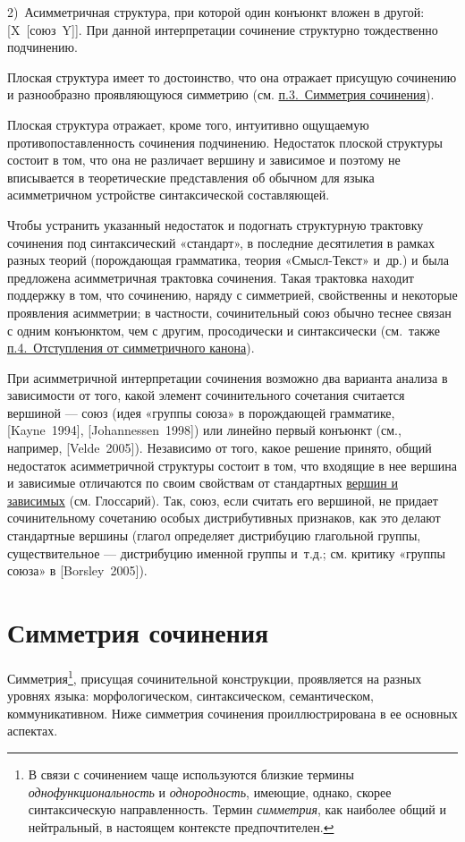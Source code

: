 2)~Асимметричная структура, при которой один конъюнкт вложен в другой:
{[}X~{[}союз~Y{]}{]}. При данной интерпретации сочинение структурно
тождественно подчинению.

Плоская структура имеет то достоинство, что она отражает присущую
сочинению и разнообразно проявляющуюся симметрию (см.
\underline{п.3.~Симметрия сочинения}).

Плоская структура отражает, кроме того, интуитивно ощущаемую
противопоставленность сочинения подчинению. Недостаток плоской структуры
состоит в том, что она не различает вершину и зависимое и поэтому не
вписывается в теоретические представления об обычном для языка
асимметричном устройстве синтаксической составляющей.

Чтобы устранить указанный недостаток и подогнать структурную трактовку
сочинения под синтаксический «стандарт», в последние десятилетия в
рамках разных теорий (порождающая грамматика, теория «Смысл-Текст»
и~др.) и была предложена асимметричная трактовка сочинения. Такая
трактовка находит поддержку в том, что сочинению, наряду с симметрией,
свойственны и некоторые проявления асимметрии; в частности,
сочинительный союз обычно теснее связан с одним конъюнктом, чем с
другим, просодически и синтаксически (см.~также
\underline{п.4.~Отступления от симметричного канона}).

При асимметричной интерпретации сочинения возможно два варианта анализа
в зависимости от того, какой элемент сочинительного сочетания считается
вершиной --- союз (идея «группы союза» в порождающей грамматике,
{[}Kayne~1994{]}, {[}Johannessen~1998{]}) или линейно первый конъюнкт
(см., например, {[}Velde~2005{]}). Независимо от того, какое решение
принято, общий недостаток асимметричной структуры состоит в том, что
входящие в нее вершина и зависимые отличаются по своим свойствам от
стандартных \underline{вершин и зависимых} (см. Глоссарий). Так, союз,
если считать его вершиной, не придает сочинительному сочетанию особых
дистрибутивных признаков, как это делают стандартные вершины (глагол
определяет дистрибуцию глагольной группы, существительное --- дистрибуцию
именной группы и~т.д.; см. критику «группы союза» в {[}Borsley~2005{]}).

\section{Симметрия
  сочинения}\label{ux441ux438ux43cux43cux435ux442ux440ux438ux44f-ux441ux43eux447ux438ux43dux435ux43dux438ux44f}

Симметрия\footnote{В связи с сочинением чаще используются близкие
  термины \textit{однофункциональность} и \textit{однородность}, имеющие,
  однако, скорее синтаксическую направленность. Термин \textit{симметрия},
  как наиболее общий и нейтральный, в настоящем контексте
  предпочтителен.}, присущая сочинительной конструкции, проявляется на
разных уровнях языка: морфологическом, синтаксическом, семантическом,
коммуникативном. Ниже симметрия сочинения проиллюстрирована в ее
основных аспектах.


